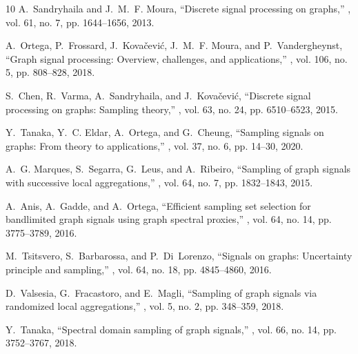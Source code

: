 \documentclass[journal]{IEEEtran}
\begin{document}
\begin{thebibliography}{10}
    A.~Sandryhaila and J.~M.~F. Moura,
    \newblock ``Discrete signal processing on graphs,''
    , vol. 61, no. 7, pp. 1644--1656, 2013.
    
    A.~Ortega, P.~Frossard, J.~Kovačević, J.~M.~F. Moura, and P.~Vandergheynst,
    \newblock ``Graph signal processing: Overview, challenges, and applications,''
    , vol. 106, no. 5, pp. 808--828, 2018.
    
    S.~Chen, R.~Varma, A.~Sandryhaila, and J.~Kovačević,
    \newblock ``Discrete signal processing on graphs: Sampling theory,''
    , vol. 63, no. 24, pp. 6510--6523, 2015.
    
    Y.~Tanaka, Y.~C. Eldar, A.~Ortega, and G.~Cheung,
    \newblock ``Sampling signals on graphs: From theory to applications,''
    , vol. 37, no. 6, pp. 14--30, 2020.
    
    A.~G. Marques, S.~Segarra, G.~Leus, and A.~Ribeiro,
    \newblock ``Sampling of graph signals with successive local aggregations,''
    , vol. 64, no. 7, pp. 1832--1843, 2015.
    
    A.~Anis, A.~Gadde, and A.~Ortega,
    \newblock ``Efficient sampling set selection for bandlimited graph signals using graph spectral proxies,''
    , vol. 64, no. 14, pp. 3775--3789, 2016.
    
    M.~Tsitsvero, S.~Barbarossa, and P.~Di~Lorenzo,
    \newblock ``Signals on graphs: Uncertainty principle and sampling,''
    , vol. 64, no. 18, pp. 4845--4860, 2016.
    
    D.~Valsesia, G.~Fracastoro, and E.~Magli,
    \newblock ``Sampling of graph signals via randomized local aggregations,''
    , vol. 5, no. 2, pp. 348--359, 2018.
    
    Y.~Tanaka,
    \newblock ``Spectral domain sampling of graph signals,''
    , vol. 66, no. 14, pp. 3752--3767, 2018.
    

\end{thebibliography}
\end{document}

